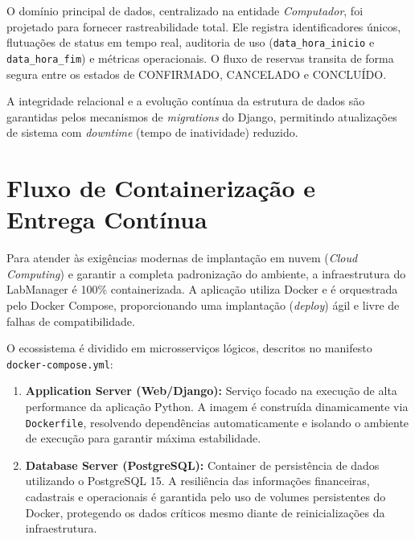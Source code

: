 \documentclass[12pt,a4paper]{article}
\begin{document}
	O domínio principal de dados, centralizado na entidade \textit{Computador}, foi projetado para fornecer rastreabilidade total. Ele registra identificadores únicos, flutuações de status em tempo real, auditoria de uso (\texttt{data\_hora\_inicio} e \texttt{data\_hora\_fim}) e métricas operacionais. O fluxo de reservas transita de forma segura entre os estados de CONFIRMADO, CANCELADO e CONCLUÍDO.
	
	A integridade relacional e a evolução contínua da estrutura de dados são garantidas pelos mecanismos de \textit{migrations} do Django, permitindo atualizações de sistema com \textit{downtime} (tempo de inatividade) reduzido.
	
	
	\section{Fluxo de Containerização e Entrega Contínua}
	
	Para atender às exigências modernas de implantação em nuvem (\textit{Cloud Computing}) e garantir a completa padronização do ambiente, a infraestrutura do LabManager é 100\% containerizada. A aplicação utiliza Docker e é orquestrada pelo Docker Compose, proporcionando uma implantação (\textit{deploy}) ágil e livre de falhas de compatibilidade.
	
	O ecossistema é dividido em microsserviços lógicos, descritos no manifesto \texttt{docker-compose.yml}:
	
	\begin{enumerate}
		
		\item \textbf{Application Server (Web/Django):} Serviço focado na execução de alta performance da aplicação Python. A imagem é construída dinamicamente via \texttt{Dockerfile}, resolvendo dependências automaticamente e isolando o ambiente de execução para garantir máxima estabilidade.
		
		\item \textbf{Database Server (PostgreSQL):} Container de persistência de dados utilizando o PostgreSQL 15. A resiliência das informações financeiras, cadastrais e operacionais é garantida pelo uso de volumes persistentes do Docker, protegendo os dados críticos mesmo diante de reinicializações da infraestrutura.
		
	\end{enumerate}
	
\end{document}
